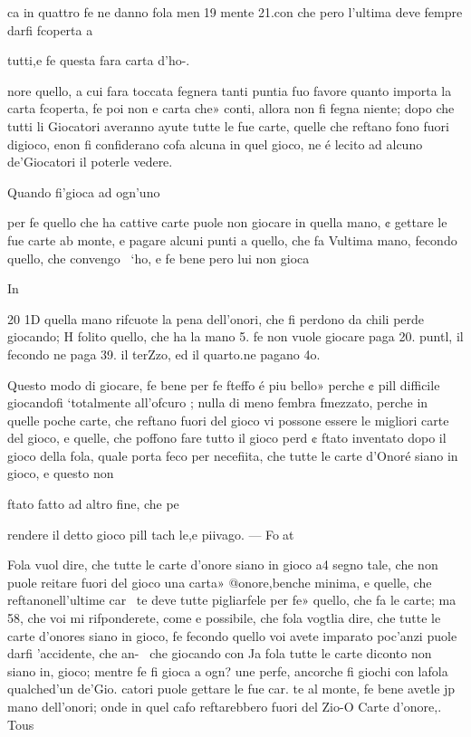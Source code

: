 \documentclass[12pt,a6paper]{article}
\begin{document}
ca in quattro fe ne danno fola men19
mente 21.con che pero l’ultima
deve fempre darfi fcoperta a

tutti,e fe questa fara carta d’ho-.

nore quello, a cui fara toccata
fegnera tanti puntia fuo favore
quanto importa la carta fcoperta, fe poi non e carta che»
conti, allora non fi fegna niente; dopo che tutti li Giocatori
averanno ayute tutte le fue carte, quelle che reftano fono fuori digioco, enon fi confiderano cofa alcuna in quel gioco, ne
é lecito ad alcuno de’Giocatori
il poterle vedere.

Quando fi'gioca ad ogn’uno

per fe quello che ha cattive carte puole non giocare in quella
mano, ¢ gettare le fue carte ab
monte, e pagare alcuni punti
a quello, che fa Vultima mano,
fecondo quello, che convengo~
‘ho, e fe bene pero lui non gioca

In
 

 

20
1D quella mano rifcuote la pena
dell’onori, che fi perdono da
chili perde giocando; H folito
quello, che ha la mano 5. fe non
vuole giocare paga 20. puntl, il
fecondo ne paga 39. il terZzo, ed
il quarto.ne pagano 4o.

Questo modo di giocare, fe
bene per fe fteffo é piu bello»
perche ¢ pill difficile giocandofi
‘totalmente all’ofcuro ; nulla di
meno fembra fmezzato, perche
in quelle poche carte, che reftano fuori del gioco vi possone
essere le migliori carte del gioco, e quelle, che poffono fare
tutto il gioco perd ¢ ftato inventato dopo il gioco della fola, quale porta feco per necefiita, che tutte le carte d’Onoré
siano in gioco, e questo non

ftato fatto ad altro fine, che pe

rendere il detto gioco pill tach
le,e piivago. — Foat

Fola vuol dire, che tutte le
carte d’onore siano in gioco a4
segno tale, che non puole reitare fuori del gioco una carta»
@onore,benche minima, e quelle, che reftanonell’ultime car~
te deve tutte pigliarfele per fe»
quello, che fa le carte; ma 58,
che voi mi rifponderete, come
e possibile, che fola vogtlia dire, che tutte le carte d’onores
siano in gioco, fe fecondo quello voi avete imparato poc’anzi
puole darfi ’accidente, che an-~
che giocando con Ja fola tutte
le carte diconto non siano in,
gioco; mentre fe fi gioca a ogn?
une perfe, ancorche fi giochi
con lafola qualched’un de’Gio.
catori puole gettare le fue car.
te al monte, fe bene avetle jp
mano dell’onori; onde in quel
cafo reftarebbero fuori del Zio-O Carte d’onore,. Tous
\end{document}
